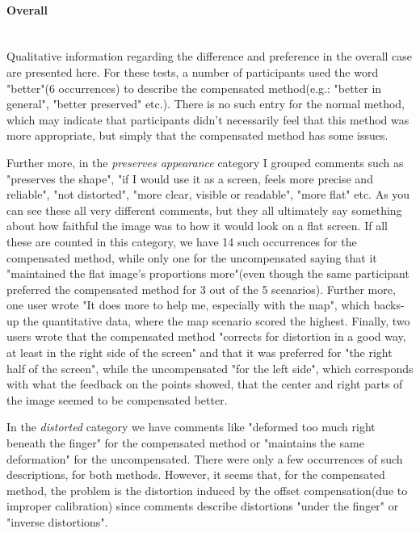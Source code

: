 \documentclass[]{article}
\begin{document}
\paragraph{Overall}\mbox{}\\

Qualitative information regarding the difference and preference in the overall case are presented here. For these tests, a number of participants used the word "better"(6 occurrences) to describe the compensated method(e.g.: "better in general", "better preserved" etc.). There is no such entry for the normal method, which may indicate that participants didn't necessarily feel that this method was more appropriate, but simply that the compensated method has some issues.

Further more, in the \textit{preserves appearance} category I grouped comments such as "preserves the shape", "if I would use it as a screen, feels more precise and reliable", "not distorted", "more clear, visible or readable", "more flat" etc. As you can see these all very different comments, but they all ultimately say something about how faithful the image was to how it would look on a flat screen. If all these are counted in this category, we have 14 such occurrences for the compensated method, while only one for the uncompensated saying that it "maintained the flat image's proportions more"(even though the same participant preferred the compensated method for 3 out of the 5 scenarios). Further more, one user wrote "It does more to help me, especially with the map", which backs-up the quantitative data, where the map scenario scored the highest. Finally, two users wrote that the compensated method "corrects for distortion in a good way, at least in the right side of the screen" and that it was preferred for "the right half of the screen", while the uncompensated  "for the left side", which corresponds with what the feedback on the points showed, that the center and right parts of the image seemed to be compensated better. 


In the \textit{distorted} category we have comments like "deformed too much right beneath the finger" for the compensated method or "maintains the same deformation" for the uncompensated. There were only a few occurrences of such descriptions, for both methods. However, it seems that, for the compensated method, the problem is the distortion induced by the offset compensation(due to improper calibration) since comments describe distortions "under the finger" or "inverse distortions".
\end{document}
